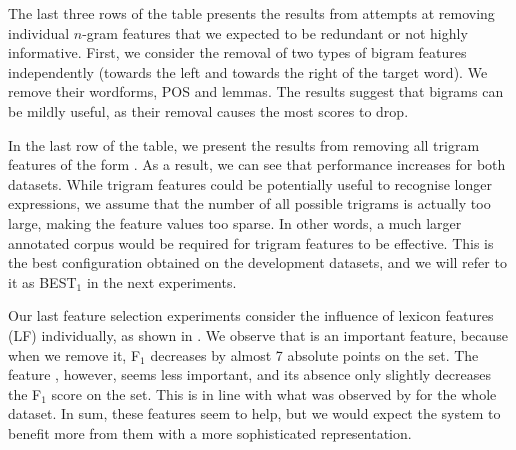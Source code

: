 \documentclass[output=paper,
modfonts
]{langscibook}
\begin{document}
The last three rows of the table presents the results from attempts at removing individual $n$-gram features that we expected to be redundant or not highly informative.
First, we consider the removal of two types of bigram features independently (towards the left and towards the right of the target word). We remove their wordforms, POS and lemmas. The results suggest that bigrams can be mildly useful, as their removal causes the most scores to drop.

In the last row of the table, we present the results from removing all trigram features of the form . As a result, we can see that performance increases for both datasets. While trigram features could be potentially useful to recognise longer expressions, we assume that the number of all possible trigrams is actually too large, making the feature values too sparse. In other words, a much larger annotated corpus would be required for trigram features to be effective. %
This is the best configuration obtained on the development datasets, and we will refer to it as \textsc{BEST$_1$} in the next experiments.


Our last feature selection experiments consider the influence of lexicon features (\textsc{LF}) individually, as shown in . We observe that  is an important feature, because when we remove it, F$_1$ decreases by almost 7 absolute points on the \devDD{} set. The feature , however, seems less important, and its absence only slightly decreases the F$_1$ score on the \devAQ{} set. This is in line with what was observed by \citet{nasr:acl:2015} for the whole dataset. In sum, these features seem to help, but we would expect the system to benefit more from them with a more sophisticated representation.
\end{document}
